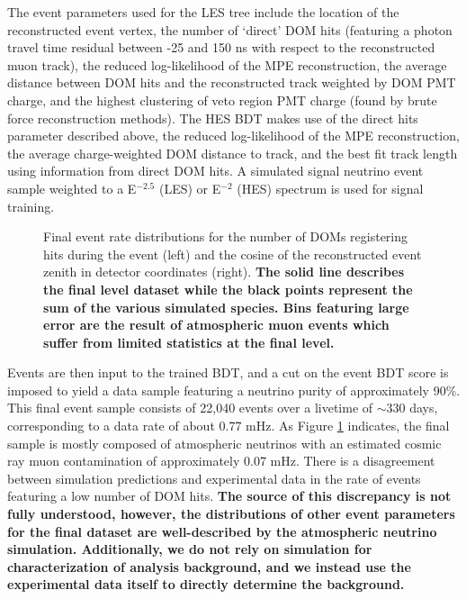 \documentclass[manuscript]{aastex}
\begin{document}
The event parameters used for the LES tree include the location of the reconstructed event vertex, the number of `direct' DOM hits (featuring a photon travel time residual between -25 and 150 ns with respect to the reconstructed muon track), the reduced log-likelihood of the MPE reconstruction, the average distance between DOM hits and the reconstructed track weighted by DOM PMT charge, and the highest clustering of veto region PMT charge (found by brute force reconstruction methods). The HES BDT makes use of the direct hits parameter described above, the reduced log-likelihood of the MPE reconstruction, the average charge-weighted DOM distance to track, and the best fit track length using information from direct DOM hits. A simulated signal neutrino event sample weighted to a E$^{-2.5}$ (LES) or E$^{-2}$ (HES) spectrum is used for signal training.
\begin{figure}[ht]
\caption[Final Sample Event Parameter Distributions]{Final event rate distributions for the number of DOMs registering hits during the event (left) and the cosine of the reconstructed event zenith in detector coordinates (right). \textbf{The solid line describes the final level dataset while the black points represent the sum of the various simulated species. Bins featuring large error are the result of atmospheric muon events which suffer from limited statistics at the final level.}}
\label{fig:PostBDTDistributions}
\end{figure}

Events are then input to the trained BDT, and a cut on the event BDT score is imposed to yield a data sample featuring a neutrino purity of approximately 90$\%$. This final event sample consists of 22,040 events over a livetime of $\sim$330 days, corresponding to a data rate of about 0.77 mHz. As Figure \ref{fig:PostBDTDistributions} indicates, the final sample is mostly composed of atmospheric neutrinos with an estimated cosmic ray muon contamination of approximately 0.07 mHz. There is a disagreement between simulation predictions and experimental data in the rate of events featuring a low number of DOM hits. \textbf{The source of this discrepancy is not fully understood, however, the distributions of other event parameters for the final dataset are well-described by the atmospheric neutrino simulation. Additionally, we do not rely on simulation for characterization of analysis background, and we instead use the experimental data itself to directly determine the background.}
\end{document}
